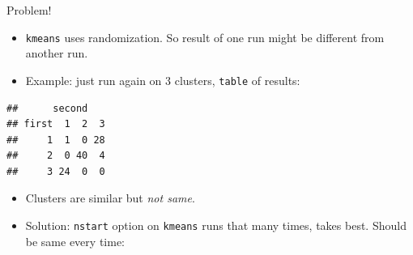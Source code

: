 \documentclass[ignorenonframetext,]{beamer}
\newenvironment{Shaded}{\begin{snugshade}}{\end{snugshade}}
\newcommand{\DataTypeTok}[1]{\textcolor[rgb]{0.13,0.29,0.53}{#1}}
\newcommand{\DecValTok}[1]{\textcolor[rgb]{0.00,0.00,0.81}{#1}}
\newcommand{\KeywordTok}[1]{\textcolor[rgb]{0.13,0.29,0.53}{\textbf{#1}}}
\newcommand{\NormalTok}[1]{#1}
\newcommand{\OperatorTok}[1]{\textcolor[rgb]{0.81,0.36,0.00}{\textbf{#1}}}
\newcommand{\StringTok}[1]{\textcolor[rgb]{0.31,0.60,0.02}{#1}}
\begin{document}
\begin{frame}[fragile]{Problem!}
\protect\hypertarget{problem}{}

\begin{itemize}
\item
  \texttt{kmeans} uses randomization. So result of one run might be
  different from another run.
\item
  Example: just run again on 3 clusters, \texttt{table} of results:
\end{itemize}

\begin{Shaded}
\end{Shaded}

\begin{verbatim}
##      second
## first  1  2  3
##     1  1  0 28
##     2  0 40  4
##     3 24  0  0
\end{verbatim}

\begin{itemize}
\item
  Clusters are similar but \emph{not same}.
\item
  Solution: \texttt{nstart} option on \texttt{kmeans} runs that many
  times, takes best. Should be same every time:
\end{itemize}

\begin{Shaded}
\end{Shaded}

\end{frame}
\end{document}
